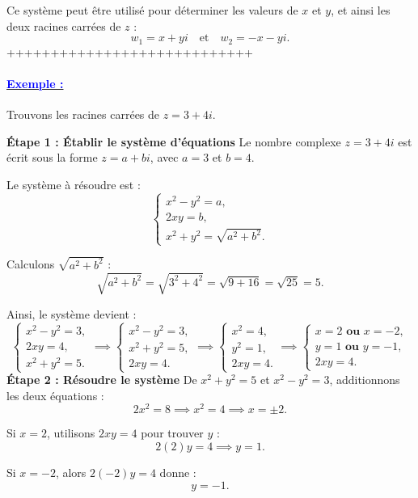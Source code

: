 \documentclass[12pt]{article}
\begin{document}
Ce système peut être utilisé pour déterminer les valeurs de \( x \) et \( y \), et ainsi les deux racines carrées de \( z \) :
\[
w_1 = x + yi \quad \text{et} \quad w_2 = -x - yi.
\]
++++++++++++++++++++++++++++
\paragraph{\underline{\textbf{\textcolor{blue}{Exemple :}}}}

Trouvons les racines carrées de \( z = 3 + 4i \).

\textbf{Étape 1 : Établir le système d'équations}  
Le nombre complexe \( z = 3 + 4i \) est écrit sous la forme \( z = a + bi \), avec \( a = 3 \) et \( b = 4 \).  

Le système à résoudre est :
\[
\begin{cases}
x^2 - y^2 = a, \\
2xy = b, \\
x^2 + y^2 = \sqrt{a^2 + b^2}.
\end{cases}
\]

Calculons \( \sqrt{a^2 + b^2} \) :
\[
\sqrt{a^2 + b^2} = \sqrt{3^2 + 4^2} = \sqrt{9 + 16} = \sqrt{25} = 5.
\]

Ainsi, le système devient :
\[
\begin{cases}
x^2 - y^2 = 3, \\
2xy = 4, \\
x^2 + y^2 = 5.
\end{cases}\implies
\begin{cases}
x^2 - y^2 = 3, \\
x^2 + y^2 = 5,\\
2xy = 4.
\end{cases}\implies
\begin{cases}
x^2 = 4, \\
y^2 = 1,\\
2xy = 4.
\end{cases}\implies
\begin{cases}
x = 2 \textbf{ ou } x = -2, \\
y = 1 \textbf{ ou } y = -1,\\
2xy = 4.
\end{cases}
\]
\textbf{Étape 2 : Résoudre le système}  
De \( x^2 + y^2 = 5 \) et \( x^2 - y^2 = 3 \), additionnons les deux équations :
\[
2x^2 = 8 \implies x^2 = 4 \implies x = \pm 2.
\]

Si \( x = 2 \), utilisons \( 2xy = 4 \) pour trouver \( y \) :
\[
2(2)y = 4 \implies y = 1.
\]

Si \( x = -2 \), alors \( 2(-2)y = 4 \) donne :
\[
y = -1.
\]
\end{document}
